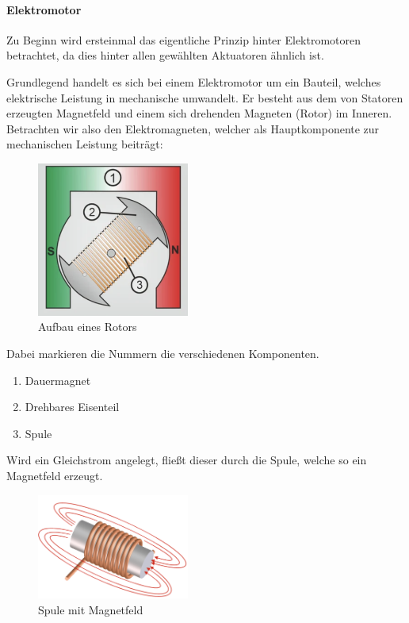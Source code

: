 \paragraph{Elektromotor} \cite*[siehe ][]{Aufbau.Elektromotoren}
Zu Beginn wird ersteinmal das eigentliche Prinzip hinter Elektromotoren betrachtet, da dies hinter allen gewählten Aktuatoren
ähnlich ist.

Grundlegend handelt es sich bei einem Elektromotor um ein Bauteil, welches elektrische Leistung in mechanische umwandelt.
Er besteht aus dem von Statoren erzeugten Magnetfeld und einem sich drehenden Magneten (Rotor) im Inneren.
Betrachten wir also den Elektromagneten, welcher als Hauptkomponente zur mechanischen Leistung beiträgt:

\begin{figure}[htbp]
	\centering
	\includegraphics[width=5cm]{img/AufbauElektromagnet}
	\caption{Aufbau eines Rotors\cite*[siehe ][]{Aufbau.Elektromotoren}}
	\label{fig:Elektromagnet}
\end{figure}
Dabei markieren die Nummern die verschiedenen Komponenten.
\begin{enumerate}
	\item Dauermagnet %
	\item Drehbares Eisenteil
	\item Spule
\end{enumerate}
Wird ein Gleichstrom angelegt, fließt dieser durch die Spule, welche so ein Magnetfeld erzeugt.
\begin{figure}[htbp]
	\centering
	\includegraphics[width=5cm]{img/Magnetfeld}
	\caption{Spule mit Magnetfeld\cite*[siehe ][]{Elektromagnete}}
	\label{fig:Magnetfeld}
\end{figure}

